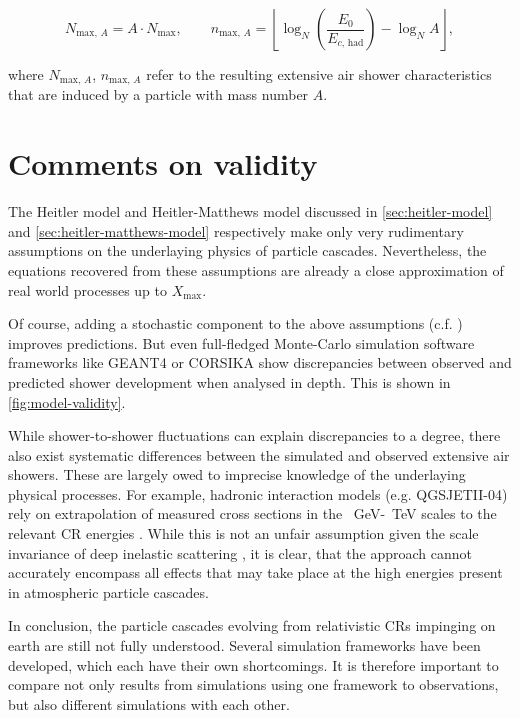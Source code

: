 \begin{equation}
N_{\text{max},\,A} = A \cdot N_{\text{max}}, \qquad n_{\text{max},\,A} = \left\lfloor \log_N\left(\frac{E_0}{E_{c,\,\text{had}}}\right) - \log_N A \right\rfloor,
\end{equation}

where $N_{\text{max},\,A}$, $n_{\text{max},\,A}$ refer to the resulting extensive air shower characteristics that are induced by a particle with mass number $A$.

\section{Comments on validity}
\label{sec:cr-shower-validity}

The Heitler model and Heitler-Matthews model discussed in \autoref{sec:heitler-model} and \autoref{sec:heitler-matthews-model} respectively make only very 
rudimentary assumptions on the underlaying physics of particle cascades. Nevertheless, the equations recovered from these assumptions are already a close 
approximation of real world processes up to $X_\text{max}$. 

Of course, adding a stochastic component to the above assumptions (c.f. \cite{MartinShowerSim}) improves predictions. But even full-fledged Monte-Carlo simulation 
software frameworks like GEANT4 \cite{agostinelli2003geant4} or CORSIKA \cite{heck1998corsika} show discrepancies between observed and predicted shower development
when analysed in depth. This is shown in \autoref{fig:model-validity}. 

While shower-to-shower fluctuations can explain discrepancies to a degree, there also exist systematic differences between the simulated and observed extensive air
showers. These are largely owed to imprecise knowledge of the underlaying physical processes. For example, hadronic interaction models (e.g. QGSJETII-04) rely on 
extrapolation of measured cross sections in the \SI{}{\giga\electronvolt}-\SI{}{\tera\electronvolt} scales to the relevant CR energies \cite{ostapchenko2006qgsjet}. 
While this is not an unfair assumption given the scale invariance of deep inelastic scattering \cite{fox1974early}, it is clear, that the approach cannot accurately 
encompass all effects that may take place at the high energies present in atmospheric particle cascades.

In conclusion, the particle cascades evolving from relativistic CRs impinging on earth are still not fully understood. Several simulation frameworks have been 
developed, which each have their own shortcomings. It is therefore important to compare not only results from simulations using one framework to observations, but 
also different simulations with each other.

